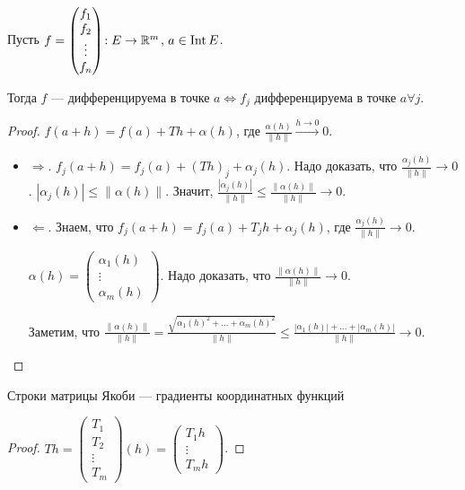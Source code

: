 \begin{theorem}
Пусть $f = \begin{pmatrix} f_1 \\ f_2 \\ \vdots \\ f_n \end{pmatrix}\!: E \to \mathbb{R}^m$, $a \in \operatorname{Int} E$.

Тогда $f$ --- дифференцируема в точке  $a \iff f_j$ дифференцируема в точке  $a \forall j$.
\end{theorem} 
\begin{proof}
    $f(a+h) = f(a) + Th + \alpha(h)$, где  $\frac{\alpha(h)}{\|h\|} \xrightarrow{h \to 0} 0$.
    \begin{itemize}
        \item $\Rightarrow$.  $f_j(a+h) = f_j(a) + (Th)_j + \alpha_j(h)$. Надо доказать, что  $\frac{\alpha_j(h)}{\|h\|} \to 0$. $|\alpha_j(h)| \le \|\alpha(h)\|$. Значит, $\frac{|\alpha_j(h)|}{\|h\|} \le \frac{\|\alpha(h)\|}{\|h\|} \to 0$.
        \item $\Leftarrow$. Знаем, что  $f_j(a+h) = f_j(a) + T_jh + \alpha_j(h)$, где  $\frac{\alpha_j(h)}{\|h\|} \to 0$. 

            $\alpha(h) = \begin{pmatrix} \alpha_1(h) \\ \vdots \\ \alpha_m(h) \end{pmatrix}$. Надо доказать, что $\frac{\|\alpha(h)\|}{\|h\|} \to 0$.

            Заметим, что $\frac{\|\alpha(h)\|}{\|h\|} = \frac{\sqrt{\alpha_1(h)^2 + \ldots + \alpha_m(h)^2}}{\|h\|} \le  \frac{|\alpha_1(h)| + \ldots + |\alpha_m(h)|}{\|h\|} \to 0$.
    \end{itemize}
\end{proof}
\begin{consequence}
    Строки матрицы Якоби --- градиенты координатных функций
\end{consequence}
\begin{proof}
    $Th = \begin{pmatrix} T_1 \\ T_2 \\ \vdots \\ T_m \end{pmatrix}(h) = \begin{pmatrix} T_1h \\ \vdots \\ T_mh \end{pmatrix}$.
\end{proof}
